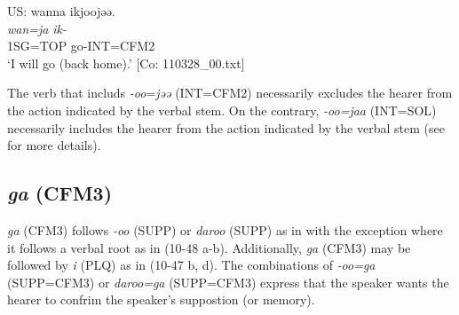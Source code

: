   \ex  US: 
      \glll wanna  ikjoojəə.\\
      \textit{wan=ja}  \textit{ik-}\\
      1SG=TOP  go-INT=CFM2\\
      \glt       ‘I will go (back home).’ [Co: 110328\_00.txt]
    \z
\z

The verb that includs \textit{{}-oo}=\textit{jəə} (INT=CFM2) necessarily excludes the hearer from the action indicated by the verbal stem. On the contrary, \textit{{}-oo=jaa} (INT=SOL) necessarily includes the hearer from the action indicated by the verbal stem (see  for more details).

\subsection{\textit{ga} (CFM3)}\label{sec:10.3.5}

\textit{ga} (CFM3) follows \textit{{}-oo} (SUPP) or \textit{daroo} (SUPP) as in  with the exception where it follows a verbal root as in (10-48 a-b). Additionally, \textit{ga} (CFM3) may be followed by \textit{i} (PLQ) as in (10-47 b, d). The combinations of \textit{{}-oo=ga} (SUPP=CFM3) or \textit{daroo=ga} (SUPP=CFM3) express that the speaker wants the hearer to confrim the speaker’s suppostion (or memory).


